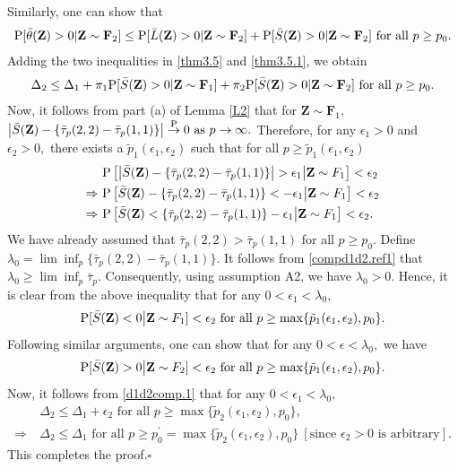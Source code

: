 \documentclass[twoside]{article}
\newcommand{\bZ}{\mathbf{Z}}
\newcommand{\bF}{\mathbf{F}}
\newcommand{\0}{\mathbf{0}}
\newcommand{\1}{\mathbf{1}}
\newcommand*{\QEDB}{\hfill\ensuremath{\square}}
\numberwithin{equation}{section}
\begin{document}
Similarly, one can show that
\begin{align}\label{thm3.5.1}
{\rm P}[\bar{\theta}(\bZ)>0|\bZ \sim \bF_2]\leq {\rm P}[\bar{L}(\bZ)>  0 |\bZ\sim \bF_2]+{\rm P}[\bar{S}(\bZ)> 0 |\bZ\sim \bF_2]\text{ for all }p\ge p_0.
\end{align}
Adding the two inequalities in \eqref{thm3.5} and \eqref{thm3.5.1}, we obtain
\begin{align}\label{d1d2comp.1}
 \Delta_2\leq \Delta_1 + \pi_1{\rm P}[\bar{S}(\bZ)> 0 |\bZ\sim \bF_1] + \pi_2 {\rm P}[\bar{S}(\bZ)> 0 |\bZ\sim \bF_2]\text{ for all }p\ge p_0.
\end{align}
Now, it follows from  part (a) of Lemma \ref{L2} that for $\bZ \sim \bF_1,$
$\big |\bar{S}(\bZ)-\{\bar{\tau}_p(2,2)-\bar{\tau}_p(1,1)\}\big|\stackrel{{\rm P}}{\to}0\text{ as }p\to\infty.$ Therefore, for any $\epsilon_1>0$ and $\epsilon_2>0,$ there exists a $\tilde{p}_1(\epsilon_1,\epsilon_2)$ such that for all $p\geq \tilde{p}_1(\epsilon_1,\epsilon_2)$
\begin{align*}
 &\ {\rm P}\left [\big |\bar{S}(\bZ)-\{\bar{\tau}_p(2,2)-\bar{\tau}_p(1,1)\}\big|>\epsilon_1\big | \bZ\sim F_1\right ]<\epsilon_2\\
 \Rightarrow &\ {\rm P}\left [\bar{S}(\bZ)-\{\bar{\tau}_p(2,2)-\bar{\tau}_p(1,1)\}<-\epsilon_1\big | \bZ\sim F_1\right ]<\epsilon_2\\
 \Rightarrow &\ {\rm P}\left [\bar{S}(\bZ) <  \{\bar{\tau}_p(2,2)-\bar{\tau}_p(1,1)\}-\epsilon_1\big | \bZ\sim F_1\right ]<\epsilon_2.
\end{align*}
We have already assumed that $\bar{\tau}_p(2,2)>\bar{\tau}_p(1,1)$ for all $p\geq p_0.$ Define $\lambda_0 = \lim\inf_p \big \{\bar{\tau}_p(2,2)-\bar{\tau}_p(1,1) \big \}$. It follows from \eqref{compd1d2.ref1} that $\lambda_0\ge \lim\inf_p\bar{\tau}_p.$ Consequently, using  assumption A2, we have $\lambda_0 > 0$. Hence, it is clear from the above inequality that for any  $0<\epsilon_1 < \lambda_0$,
$${\rm P}[\bar{S}(\bZ)< 0\big | \bZ\sim F_1]<\epsilon_2\text{ for all }p\geq \max\{\tilde{p}_1(\epsilon_1,\epsilon_2),p_0\}.$$
Following similar arguments, one can show that for any $0<\epsilon<\lambda_0,$ we have
$${\rm P}[\bar{S}(\bZ)> 0\big | \bZ\sim F_2]<\epsilon_2\text{ for all }p\geq \max\{\tilde{p}_1(\epsilon_1,\epsilon_2),p_0\}.$$
Now, it follows from \eqref{d1d2comp.1} that for any  $0<\epsilon_1 < \lambda_0,$
\begin{align*}
&\ \Delta_{2}\leq \Delta_{1}+\epsilon_2\text{ for all }p\geq \max\{\tilde{p}_2(\epsilon_1,\epsilon_2),p_0\},\\
\Rightarrow &\ \Delta_{2} \leq \Delta_{1}\text{ for all }p\geq p^\prime_0=\max\{\tilde{p}_2(\epsilon_1,\epsilon_2),p_0\}\  [\text{since }\epsilon_2>0\text{ is arbitrary}].
\end{align*}
This completes the proof.\hfill\QEDB\newline
\end{document}
